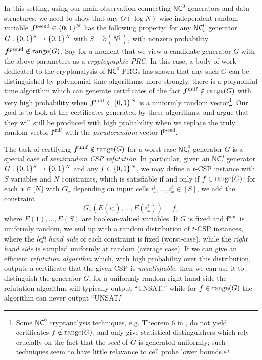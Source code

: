 In this setting, using our main observation connecting $\mathsf{NC}^0$ generators and data structures, we need to show that any $O(\log N)$-wise independent random variable $\bm{f}^{\mathrm{pseud}}\in \{0,1\}^N$ has the following property: for any $\mathsf{NC}^0_t$ generator $G: \{0,1\}^S \to \{0,1\}^N$ with $S =\tilde{o}(N^{\frac{2}{t}})$, with nonzero probability $\bm{f}^{\mathrm{pseud}}\notin \mathrm{range}(G)$. Say for a moment that we view a candidate generator $G$ with the above parameters as a \emph{cryptographic PRG}. In this case, a body of work dedicated to the cryptanalysis of $\mathsf{NC}^0$ PRGs has shown that any such $G$ can be distinguished by polynomial time algorithms; more strongly, there is a polynomial time algorithm which can generate certificates of the fact $\bm{f}^{\mathrm{unif}}\notin \mathrm{range}(G)$ with very high probability when $\bm{f}^{\mathrm{unif}}\in \{0,1\}^N$ is a uniformly random vector\footnote{Some $\mathsf{NC}^0$ cryptanalysis techniques, e.g. Theorem 6 in \cite{mossel-epsilon}, do not yield certificates $f \notin \mathrm{range}(G)$, and only give statistical distinguishers which rely crucially on the fact that the \emph{seed} of $G$ is generated uniformly; such techniques seem to have little relavance to cell probe lower bounds.}. Our goal is to look at the certificates generated by these algorithms, and argue that they will still be produced with high probability when we replace the truly random vector $\bm{f}^{\mathrm{unif}}$ with the \emph{pseudorandom} vector $\bm{f}^{\mathrm{pseud}}$.

The task of certifying $\bm{f}^{\mathrm{unif}} \notin \mathrm{range}(G)$ for a worst case $\mathsf{NC}^0_t$ generator $G$ is a special case of \emph{semirandom CSP refutation}. In particular, given an $\mathsf{NC}^0_t$ generator $G:  \{0,1\}^S \to \{0,1\}^N$ and any $f \in \{0,1\}^N$, we may define a $t$-CSP instance with $S$ variables and $N$ constraints, which is satisfiable if and only if $f \in \mathrm{range}(G)$: for each $x \in [N]$ with $G_x$ depending on input cells $i_x^1,\ldots,i_x^t\in [S]$, we add the constraint 
\[
G_x(E(i_x^1),\ldots,E(i_x^t)) = f_x
\]
where $E(1),\ldots,E(S)$ are boolean-valued variables. If $G$ is fixed and $\bm{f}^{\mathrm{unif}}$ is uniformly random, we end up with a random distribution of $t$-CSP instances, where the \emph{left hand side} of each constraint is fixed (worst-case), while the \emph{right hand side} is sampled uniformly at random (average case). If we can give an efficient \emph{refutation algorithm} which, with high probability over this distribution, outputs a certificate that the given CSP is \emph{unsatisfiable}, then we can use it to distinguish the generator $G$: for a uniformly random right hand side the refutation algorithm will typically output ``UNSAT,'' while for $f \in \mathrm{range}(G)$ the algorithm can never output ``UNSAT.''

